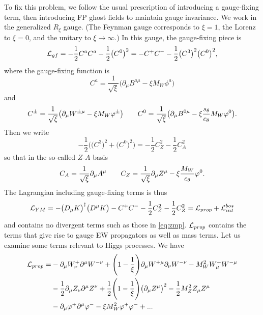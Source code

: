 To fix this problem, we follow the usual prescription of introducing a 
gauge-fixing term, then introducing FP ghost fields to maintain gauge invariance. We
work in the generalized $R_{\xi}$ gauge. (The Feynman gauge corresponds to
$\xi=1$, the Lorenz to $\xi=0$, and the unitary to $\xi\to\infty$.) In this
gauge, the gauge-fixing piece is
\begin{equation}
  \mathcal{L}_{gf}=-\frac{1}{2}C^a C^a -\frac{1}{2}\big(C^0\big)^2
            =-C^+ C^- -\frac{1}{2}\big(C^3\big)^2\big(C^0\big)^2,
\end{equation}
where the gauge-fixing function is
\begin{equation}
  C^a =\frac{1}{\sqrt{\xi}}\big(\partial_{\mu}B^{a\mu}
                -\xi M_W \phi^a \big)
\end{equation}
and
\begin{equation}
  \label{eq:cdefs}
  C^{\pm}=\frac{1}{\sqrt{\xi}}\big(\partial_{\mu}W^{\pm\mu}
                   -\xi M_W \varphi^{\pm}\big) \qquad
  C^{0}=\frac{1}{\sqrt{\xi}}\big(\partial_{\mu}B^{0\mu}
                   -\xi\frac{s_{\theta}}{c_{\theta}}M_W \varphi^{0}\big).
\end{equation}
Then we write
\begin{equation}
  -\frac{1}{2}\Big(\big(C^3\big)^2 +\big(C^0\big)^2\Big)
       =-\frac{1}{2}C_Z^2 -\frac{1}{2}C_A^2
\end{equation}
so that in the so-called $Z$-$A$ basis
\begin{equation}
  \label{eq:zadefs}
  C_A=\frac{1}{\sqrt{\xi}}\partial_{\mu}A^{\mu} \qquad
  C_Z=\frac{1}{\sqrt{\xi}}\partial_{\mu}Z^{\mu}-\xi\frac{M_W}{c_{\theta}}\varphi^0.
\end{equation}
The Lagrangian including gauge-fixing terms is thus
\begin{equation}
  \mathcal{L}_{YM}=-\big(D_{\mu}K\big)^{\dagger}\big(D^{\mu}K\big)-C^+ C^-
               -\frac{1}{2}C_Z^2-\frac{1}{2}C_Z^2
            =\mathcal{L}_{prop}+\mathcal{L}_{int}^{bos}
\end{equation}
and contains no divergent terms such as those in \eqref{eq:zmp}. $\mathcal{L}_{prop}$
contains the terms that give rise to gauge EW propagators as well as mass
terms. Let us examine some terms relevant to Higgs processes. We have
\begin{equation}
  \begin{aligned}
  \mathcal{L}_{prop}=&-\partial_{\mu}W_{\nu}^+ \partial^{\mu}W^{-\nu}
     +\Bigg(1-\frac{1}{\xi}\Bigg)\partial_{\mu}W^{+\mu}\partial_{\nu}W^{-\nu}
     -M_W^2 W_{\mu}^+ W^{-\mu} \\
    &-\frac{1}{2}\partial_{\mu}Z_{\nu}\partial^{\mu}Z^{\nu}
     +\frac{1}{2}\Bigg(1-\frac{1}{\xi}\Bigg)\big(\partial_{\mu}Z^{\mu}\big)^2
     -\frac{1}{2}M_Z^2 Z_{\mu}Z^{\mu} \\
    &-\partial_{\mu}\varphi^+ \partial^{\mu}\varphi^- -\xi M_W^2\varphi^+ \varphi^-
     +...
  \end{aligned}
\end{equation}
